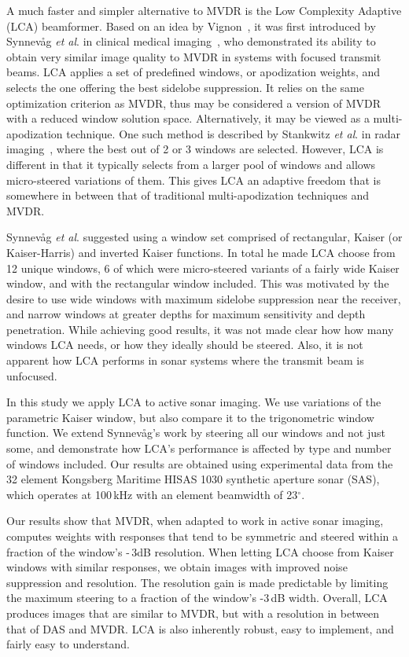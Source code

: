 \documentclass[10pt,journal,draftclsnofoot,onecolumn]{IEEEtran}
\newcommand\1{\vec 1}
\begin{document}
A much faster and simpler alternative to MVDR is the Low Complexity Adaptive (LCA) beamformer. Based on an idea by Vignon~\cite{Vignon2008}, it was first introduced by Synnev\aa{}g \emph{et al}. in clinical medical imaging~\cite{Synnevag2008}, who demonstrated its ability to obtain very similar image quality to MVDR in systems with focused transmit beams. LCA applies a set of predefined windows, or apodization weights, and selects the one offering the best sidelobe suppression. It relies on the same optimization criterion as MVDR, thus may be considered a version of MVDR with a reduced window solution space. Alternatively, it may be viewed as a multi-apodization technique. One such method is described by Stankwitz \emph{et al}. in radar imaging~\cite{Stankwitz1995}, where the best out of 2 or 3 windows are selected. However, LCA is different in that it typically selects from a larger pool of windows and allows micro-steered variations of them. This gives LCA an adaptive freedom that is somewhere in between that of traditional multi-apodization techniques and MVDR.

Synnev\aa{}g \emph{et al}. suggested using a window set comprised of rectangular, Kaiser (or Kaiser-Harris) and inverted Kaiser functions. In total he made LCA choose from 12 unique windows, 6 of which were micro-steered variants of a fairly wide Kaiser window, and with the rectangular window included. This was motivated by the desire to use wide windows with maximum sidelobe suppression near the receiver, and narrow windows at greater depths for maximum sensitivity and depth penetration. While achieving good results, it was not made clear how how many windows LCA needs, or how they ideally should be steered. Also, it is not apparent how LCA performs in sonar systems where the transmit beam is unfocused.

In this study we apply LCA to active sonar imaging. We use variations of the parametric Kaiser window, but also compare it to the trigonometric window function. We extend Synnev\aa{}g's work by steering all our windows and not just some, and demonstrate how LCA's performance is affected by type and number of windows included. Our results are obtained using experimental data from the 32 element Kongsberg Maritime HISAS 1030 synthetic aperture sonar (SAS), which operates at 100\,kHz with an element beamwidth of 23$^\circ$. 

Our results show that MVDR, when adapted to work in active sonar imaging, computes weights with responses that tend to be symmetric and steered within a fraction of the window's -\,3dB resolution. When letting LCA choose from Kaiser windows with similar responses, we obtain images with improved noise suppression and resolution. The resolution gain is made predictable by limiting the maximum steering to a fraction of the window's -3\,dB width. Overall, LCA produces images that are similar to MVDR, but with a resolution in between that of DAS and MVDR. LCA is also inherently robust, easy to implement, and fairly easy to understand.
\end{document}
